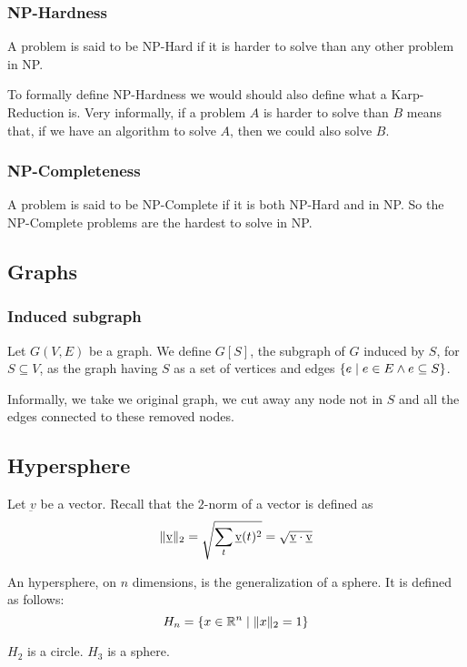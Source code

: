     \subsubsection{NP-Hardness}
        A problem is said to be NP-Hard if it is harder to solve than any other problem in NP.

        To formally define NP-Hardness we would should also define what a Karp-Reduction is.
        Very informally, if a problem $A$ is harder to solve than $B$ means that, if we have an algorithm to solve $A$, then we could also solve $B$.

    \subsubsection{NP-Completeness}
        A problem is said to be NP-Complete if it is both NP-Hard and in NP.
        So the NP-Complete problems are the hardest to solve in NP.


\subsection{Graphs}

    \subsubsection{Induced subgraph}\label{subsubsec:induced_subgraph}
        Let $G(V,E)$ be a graph. We define $G[S]$, the subgraph of $G$ induced by $S$, for $S \subseteq V$, as the graph having $S$ as a set of vertices and edges $\{ e \; \vert \; e \in E \wedge e \subseteq S \}$.

        Informally, we take we original graph, we cut away any node not in $S$ and all the edges connected to these removed nodes.


\subsection{Hypersphere}\label{subsec:hypersphere}
    Let $\underbar{v}$ be a vector. Recall that the $2$-norm of a vector is defined as
    \[ \lVert \underbar{v} \rVert_2 = \sqrt{\sum_t \underbar{v}(t)^2} = \sqrt{\underbar{v} \cdot \underbar{v}} \]

    An hypersphere, on $n$ dimensions, is the generalization of a sphere.
    It is defined as follows:
    \[ H_n = \{ x \in \mathbb{R}^n \; \vert \; \lVert x \rVert_2 = 1 \} \]

    $H_2$ is a circle. $H_3$ is a sphere.